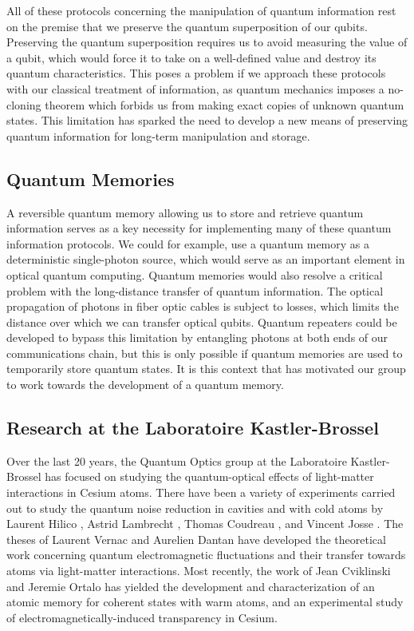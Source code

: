 All of these protocols concerning the manipulation of quantum information rest
on the premise that we preserve the quantum superposition of our qubits.  Preserving the quantum superposition requires us to avoid measuring the value of a qubit, which would force it to take on a well-defined value and destroy its quantum characteristics.  This poses a problem if we approach these protocols with our classical treatment of information, as quantum mechanics imposes a no-cloning theorem which forbids us from making exact copies of unknown quantum states.  This limitation has sparked the need to develop a new means of preserving quantum information for long-term manipulation and storage.

\subsection*{Quantum Memories}

A reversible quantum memory allowing us to store and retrieve quantum
information serves as a key necessity for implementing many of these quantum
information protocols.  We could for example, use a quantum memory as a
deterministic single-photon source, which would serve as an important element
in optical quantum computing.  Quantum memories would also resolve a critical
problem with the long-distance transfer of quantum information.  The optical
propagation of photons in fiber optic cables is subject to losses, which limits the
distance over which we can transfer optical qubits.  Quantum repeaters could
be developed to bypass this limitation by entangling photons at both ends of
our communications chain, but this is only possible if quantum memories are
used to temporarily store quantum states.  It is this context that has
motivated our group to work towards the development of a quantum memory.



\subsection*{Research at the Laboratoire Kastler-Brossel}

Over the last 20 years, the Quantum Optics group at the Laboratoire Kastler-Brossel has focused on studying the quantum-optical effects of light-matter interactions in Cesium atoms.  There have been a variety of experiments carried out to study the quantum noise reduction in cavities and with cold atoms by Laurent Hilico \cite{HilicoPhD}, Astrid Lambrecht \cite{LambrechtPhD}, Thomas Coudreau \cite{CoudreauPhD}, and Vincent Josse \cite{JossePhD}.  The theses of Laurent Vernac \cite{VernacPhD} and Aurelien Dantan \cite{DantanPhD} have developed the theoretical work concerning quantum electromagnetic fluctuations and their transfer towards atoms via light-matter interactions.  Most recently, the work of Jean Cviklinski \cite{CviklinskiPhD} and Jeremie Ortalo \cite{ortalo} has yielded the development and characterization of an atomic memory for coherent states with warm atoms, and an experimental study of electromagnetically-induced transparency in Cesium.

